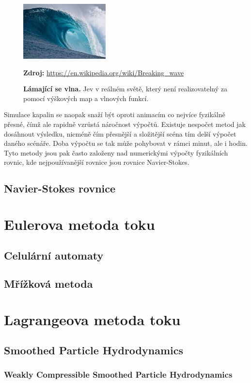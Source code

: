 \begin{figure}[hbt]
	\centering
	\captionsetup{justification=centering}
	\includegraphics[width=0.4\textwidth]{obrazky-figures/Large_breaking_wave.jpg}
	\caption{\textbf{Lámající se vlna.} Jev v reálném světě, který není realizovatelný za pomocí výškových map a vlnových funkcí.}
	\textbf{Zdroj: } \url{https://en.wikipedia.org/wiki/Breaking_wave}
	\label{keepCalm}
\end{figure}

Simulace kapalin se naopak snaží být oproti animacím co nejvíce fyzikálně přesné, čímž ale rapidně vzrůstá náročnost výpočtů. Existuje nespočet metod jak dosáhnout výsledku, nicméně čím přesnější a složitější scéna tím delší výpočet daného scénáře. Doba výpočtu se tak může pohybovat v rámci minut, ale i hodin. Tyto metody jsou pak často založeny nad numerickými výpočty fyzikálních rovnic, kde nejpoužívanější rovnice jsou rovnice Navier-Stokes.
\subsection{Navier-Stokes rovnice}
\section{Eulerova metoda toku}
\subsection{Celulární automaty}
\subsection{Mřížková metoda}
\section{Lagrangeova metoda toku}
\subsection{Smoothed Particle Hydrodynamics}
\subsubsection{Weakly Compressible Smoothed Particle Hydrodynamics}
